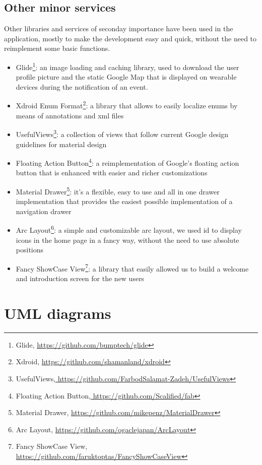 \documentclass[a4paper]{scrreprt}
\begin{document}
\section{Other minor services}
\par Other libraries and services of seconday importance have been used in the application, mostly to make the development easy and quick, without the need to reimplement some basic functions.
\begin{itemize}
\item Glide\footnote{Glide, \url{https://github.com/bumptech/glide}}: an image loading and caching library, used to download the user profile picture and the static Google Map that is displayed on wearable devices during the notification of an event.
\item Xdroid Enum Format\footnote{Xdroid, \url{https://github.com/shamanland/xdroid}}: a library that allows to easily localize enums by means of annotations and xml files
\item UsefulViews\footnote{UsefulViews,\url{ https://github.com/FarbodSalamat-Zadeh/UsefulViews}}: a collection of views that follow current Google design guidelines for material design
\item Floating Action Button\footnote{Floating Action Button,\url{ https://github.com/Scalified/fab}}: a reimplementation of Google's floating action button that is enhanced with easier and richer customizations
\item Material Drawer\footnote{Material Drawer, \url{https://github.com/mikepenz/MaterialDrawer}}: it's a flexible, easy to use and all in one drawer implementation that provides the easiest possible implementation of a navigation drawer
\item Arc Layout\footnote{Arc Layout, \url{https://github.com/ogaclejapan/ArcLayout}}: a simple and customizable arc layout, we used id to display icons in the home page in a fancy way, without the need to use absolute positions
\item Fancy ShowCase View\footnote{Fancy ShowCase View, \url{https://github.com/faruktoptas/FancyShowCaseView}}: a library that easily allowed us to build a welcome and introduction screen for the new users
\end{itemize}


\chapter{UML diagrams}
\end{document}
